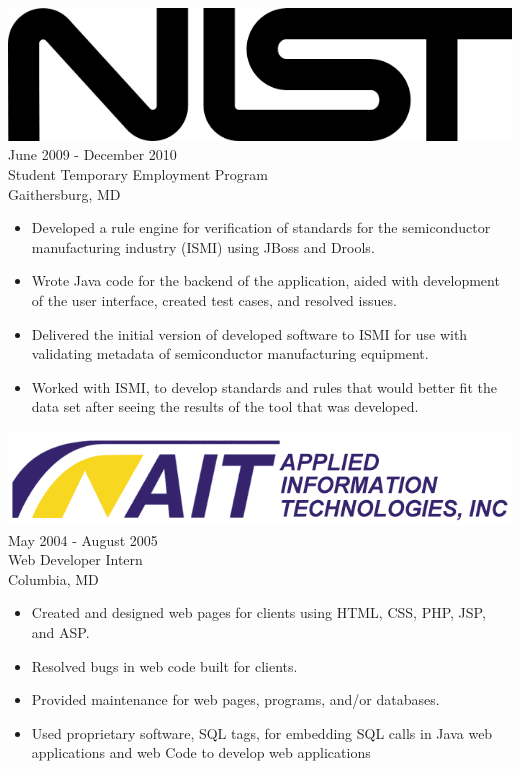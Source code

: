 \documentclass[12pt, line, margin]{res}
\begin{document}
\begin{resume}
\pagebreak

	     {\sl \includegraphics[scale=0.07]{resume_images/645px-NIST_logo.png}} \hfill            June 2009 - December 2010 \\
                Student Temporary Employment Program \\ Gaithersburg, MD
                \begin{itemize}  \itemsep -2pt %
                 \item Developed a rule engine for verification of standards
			 for the \newline semiconductor manufacturing industry (ISMI)
    			using JBoss and Drools.
                 \item Wrote Java code for the backend of the application, aided
			 with development of the user interface,
    			created test cases, and resolved issues.
                 \item Delivered the initial version of developed software to ISMI
			 for use with validating metadata of semiconductor
			 manufacturing \newline equipment.
                 \item Worked with ISMI, to develop standards and rules that would
			 better fit the data set after seeing the
    			results of the tool that was developed.
                 \end{itemize} 

                {\sl \includegraphics[scale=0.2] {resume_images/ait_inc_logo.png}} \hfill        May 2004 - August 2005 \\
                Web Developer Intern \\ Columbia, MD
                  \begin{itemize}   \itemsep -2pt %
                 \item Created and designed web pages for clients using
			 HTML, CSS, PHP, JSP, and ASP.
                 \item Resolved bugs in web code built for clients.
                 \item Provided maintenance for web pages, programs, and/or databases.
                 \item Used proprietary software, SQL tags, for embedding
			SQL calls in Java web applications and web
  			Code to develop web applications
                   \end{itemize} 


\end{resume}
\end{document}
